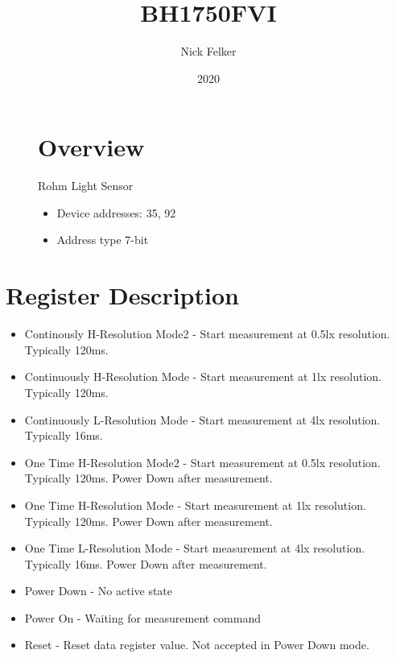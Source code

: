 \documentclass[a4paper,12pt,oneside,pdflatex,italian,final,twocolumn]{article}
\title{ BH1750FVI }
\author{ Nick Felker }
\date{ 2020 }
\begin{document}
\pagestyle{fancy}



\onecolumn


\begin{figure}
\begin{minipage}{0.47\textwidth}

\section{Overview}
    Rohm Light Sensor
    \begin{itemize}
        \item Device addresses:
          35,
          92
        \item Address type 7-bit
    \end{itemize}


\end{minipage}
\hfill

\end{figure}


\section{Register Description}
\begin{itemize}
\item Continously H-Resolution Mode2 - Start measurement at 0.5lx resolution. Typically 120ms.
\item Continuously H-Resolution Mode - Start measurement at 1lx resolution. Typically 120ms.
\item Continuously L-Resolution Mode - Start measurement at 4lx resolution. Typically 16ms.
\item One Time H-Resolution Mode2 - Start measurement at 0.5lx resolution. Typically 120ms.
Power Down after measurement.

\item One Time H-Resolution Mode - Start measurement at 1lx resolution. Typically 120ms.
Power Down after measurement.

\item One Time L-Resolution Mode - Start measurement at 4lx resolution. Typically 16ms.
Power Down after measurement.

\item Power Down - No active state
\item Power On - Waiting for measurement command
\item Reset - Reset data register value. Not accepted in Power Down mode.
\end{itemize}
\end{document}
